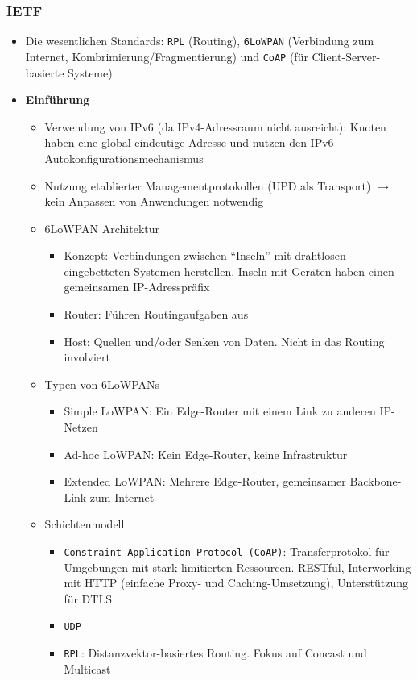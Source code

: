 \subsubsection{IETF}
\begin{itemize}
	\item Die wesentlichen Standards: \texttt{RPL} (Routing), \texttt{6LoWPAN} (Verbindung zum Internet, Kombrimierung/Fragmentierung) und \texttt{CoAP} (für Client-Server-basierte Systeme)
	\item \textbf{Einführung}
	\begin{itemize}
		\item Verwendung von IPv6 (da IPv4-Adressraum nicht ausreicht): Knoten haben eine global eindeutige Adresse und nutzen den IPv6-Autokonfigurationsmechanismus
		\item Nutzung etablierter Managementprotokollen (UPD als Transport) \(\rightarrow\) kein Anpassen von Anwendungen notwendig
		\item 6LoWPAN Architektur
		\begin{itemize}
			\item Konzept: Verbindungen zwischen "`Inseln"' mit drahtlosen eingebetteten Systemen herstellen. Inseln mit Geräten haben einen gemeinsamen IP-Adresspräfix
			\item Router: Führen Routingaufgaben aus
			\item Host: Quellen und/oder Senken von Daten. Nicht in das Routing involviert
		\end{itemize}
		\item Typen von 6LoWPANs
		\begin{itemize}
			\item Simple LoWPAN: Ein Edge-Router mit einem Link zu anderen IP-Netzen
			\item Ad-hoc LoWPAN: Kein Edge-Router, keine Infrastruktur
			\item Extended LoWPAN: Mehrere Edge-Router, gemeinsamer Backbone-Link zum Internet
		\end{itemize}
		\item Schichtenmodell
		\begin{itemize}
			\item \texttt{Constraint Application Protocol (CoAP)}: Transferprotokol für Umgebungen mit stark limitierten Ressourcen. RESTful, Interworking mit HTTP (einfache Proxy- und Caching-Umsetzung), Unterstützung für DTLS
			\item \texttt{UDP}
			\item \texttt{RPL}: Distanzvektor-basiertes Routing. Fokus auf Concast und Multicast

\end{itemize}
\end{itemize}
\end{itemize}
